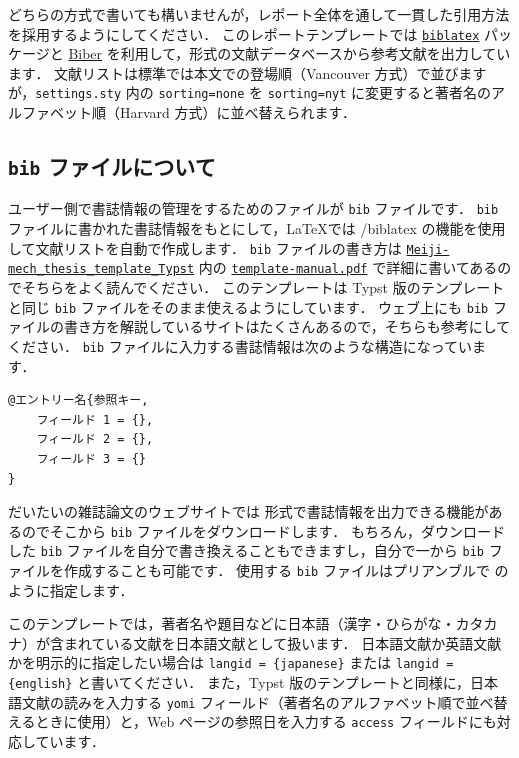 \documentclass[
    paper=a4paper,      %
    article,            %
    fontsize=11pt,      %
    jafontsize=11pt,    %
    head_space=25mm,    %
    foot_space=25mm,    %
    gutter=20mm,        %
    fore-edge=20mm      %
    ]{jlreq}            %
\begin{document}
どちらの方式で書いても構いませんが，レポート全体を通して一貫した引用方法を採用するようにしてください．
このレポートテンプレートでは \href{https://ctan.org/pkg/biblatex}{\texttt{biblatex}} パッケージと \href{https://ctan.org/pkg/biber}{Biber} を利用して，\BibTeX 形式の文献データベースから参考文献を出力しています．
文献リストは標準では本文での登場順（Vancouver 方式）で並びますが，\verb|settings.sty| 内の \verb|sorting=none| を \verb|sorting=nyt| に変更すると著者名のアルファベット順（Harvard 方式）に並べ替えられます．

\subsection{\texttt{bib} ファイルについて}
\label{ssec:bib-file}

ユーザー側で書誌情報の管理をするためのファイルが \verb|bib| ファイルです．
\verb|bib| ファイルに書かれた書誌情報をもとにして，\LaTeX では \BibTeX/biblatex の機能を使用して文献リストを自動で作成します．
\verb|bib| ファイルの書き方は \href{https://github.com/matsukawa-group/Meiji-mech_thesis_template_Typst}{\texttt{Meiji-mech\_thesis\_template\_Typst}} 内の \href{https://github.com/matsukawa-group/Meiji-mech_thesis_template_Typst/blob/main/template-manual/template-manual.pdf}{\texttt{template-manual.pdf}} で詳細に書いてあるのでそちらをよく読んでください．
このテンプレートは Typst 版のテンプレートと同じ \verb|bib| ファイルをそのまま使えるようにしています．
ウェブ上にも \verb|bib| ファイルの書き方を解説しているサイトはたくさんあるので，そちらも参考にしてください．
\verb|bib| ファイルに入力する書誌情報は次のような構造になっています．

\begin{lstlisting}
@エントリー名{参照キー,
    フィールド 1 = {},
    フィールド 2 = {},
    フィールド 3 = {}
}
\end{lstlisting}

だいたいの雑誌論文のウェブサイトでは \BibTeX 形式で書誌情報を出力できる機能があるのでそこから \verb|bib| ファイルをダウンロードします．
もちろん，ダウンロードした \verb|bib| ファイルを自分で書き換えることもできますし，自分で一から \verb|bib| ファイルを作成することも可能です．
使用する \verb|bib| ファイルはプリアンブルで \verb|| のように指定します．

このテンプレートでは，著者名や題目などに日本語（漢字・ひらがな・カタカナ）が含まれている文献を日本語文献として扱います．
日本語文献か英語文献かを明示的に指定したい場合は \verb|langid = {japanese}| または \verb|langid = {english}| と書いてください．
また，Typst 版のテンプレートと同様に，日本語文献の読みを入力する \verb|yomi| フィールド（著者名のアルファベット順で並べ替えるときに使用）と，Web ページの参照日を入力する \verb|access| フィールドにも対応しています．
\end{document}

